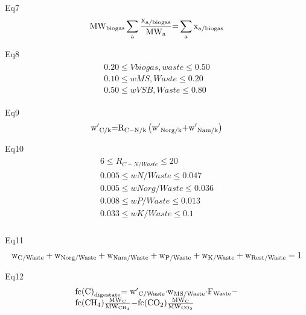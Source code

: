 \documentclass[10pt,a4paper]{article}
\begin{document}
Eq7
\begin{align}
	{\rm{M}}{{\rm{W}}_{{\rm{biogas}}}}\sum\limits_{\rm{a}} {\frac{{{{\rm{x}}_{{\rm{a/biogas}}}}}}{{{\rm{M}}{{\rm{W}}_{\rm{a}}}}}} {\rm{ = }}\sum\limits_{\rm{a}} {{{\rm{x}}_{{\rm{a/biogas}}}}}
\end{align}

Eq8
\begin{align}
	\begin{array}{l}
	0.20 \le Vbiogas,waste \le 0.50\\
	0.10 \le wMS,Waste  \le 0.20\\					
	0.50 \le wVSB,Waste  \le 0.80
	\end{array}	
\end{align}

Eq9
\begin{align}
	{\rm{w}}{{\rm{'}}_{{\rm{C/k}}}}{\rm{ = }}{{\rm{R}}_{{\rm{C - N/k}}}}\left( {{\rm{w}}{{\rm{'}}_{{\rm{Norg/k}}}}{\rm{ + w}}{{\rm{'}}_{{\rm{Nam/k}}}}} \right)
\end{align}

Eq10
\begin{align}
	\begin{array}{l}
	6 \le {R_{C - N/Waste}} \le 20 \\
	0.005 \le wN/Waste \le 0.047 \\
	0.005 \le wNorg/ Waste  \le 0.036 \\
	0.008 \le wP/ Waste  \le 0.013 \\							
	0.033 \le wK/ Waste  \le  0.1 \\
\end{array}	
\end{align}

Eq11
\begin{align}
	{{\rm{w}}_{{\rm{C}}/{\rm{ Waste}}}} + {{\rm{w}}_{{\rm{Norg}}/{\rm{ Waste}}}} + {{\rm{w}}_{{\rm{Nam}}/{\rm{ Waste}}}} + {{\rm{w}}_{{\rm{P}}/{\rm{ Waste}}}} + {{\rm{w}}_{{\rm{K}}/{\rm{ Waste}}}} + {{\rm{w}}_{{\rm{Rest}}/{\rm{ Waste}}}} = {\rm{1}}
\end{align}

Eq12
\begin{align}
	\begin{array}{l}{\rm{fc(C}}{{\rm{)}}_{{\rm{digestate}}}}{\rm{ = w}}{{\rm{'}}_{{\rm{C/Waste}}}}{\rm{\cdot}}{{\rm{w}}_{{\rm{MS/Waste}}}}{\rm{\cdot}}{{\rm{F}}_{{\rm{Waste}}}}{\rm{ - }}\\{\rm{fc(C}}{{\rm{H}}_{\rm{4}}}{\rm{)}}\frac{{{\rm{M}}{{\rm{W}}_{\rm{C}}}}}{{{\rm{M}}{{\rm{W}}_{{\rm{C}}{{\rm{H}}_{\rm{4}}}}}}}{\rm{ - fc(C}}{{\rm{O}}_{\rm{2}}}{\rm{)}}\frac{{{\rm{M}}{{\rm{W}}_{\rm{C}}}}}{{{\rm{M}}{{\rm{W}}_{{\rm{C}}{{\rm{O}}_{\rm{2}}}}}}}\end{array}
\end{align}
\end{document}
